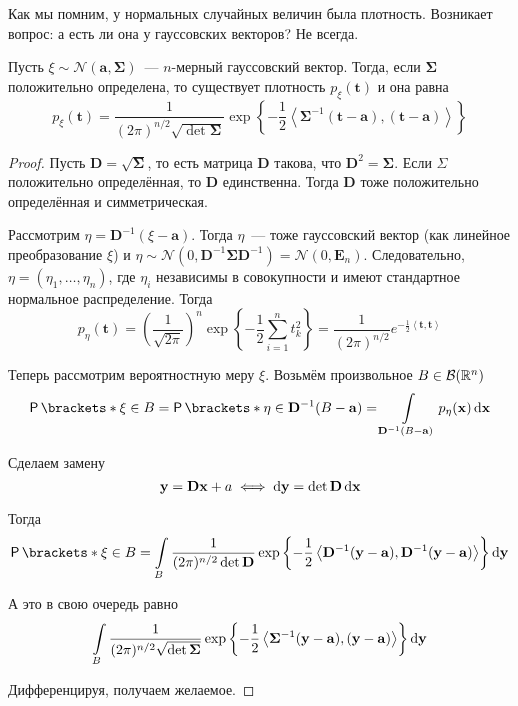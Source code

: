 Как мы помним, у нормальных случайных величин была плотность. Возникает вопрос: а есть ли она у гауссовских векторов? Не всегда.
\begin{theorem}
	Пусть \(\xi \sim \mathcal{N}(\mathbf{a}, \mathbf{\Sigma})\)~--- \(n\)-мерный гауссовский вектор. Тогда, если \(\mathbf{\Sigma}\) положительно определена, то существует плотность \(p_{\xi}(\mathbf{t})\) и она равна
	\[
		p_{\xi}(\mathbf{t}) = 
		\frac{1}{(2\pi)^{n/2}\sqrt{\det{\mathbf{\Sigma}}}} 
		\exp\left\{-\frac{1}{2}\left\langle\mathbf{\Sigma}^{-1}(\mathbf{t}
		 - \mathbf{a}), (\mathbf{t} - \mathbf{a})\right\rangle\right\}
	\]
\end{theorem}
\begin{proof}
	Пусть \(\mathbf{D} = \sqrt{\mathbf{\Sigma}}\), то есть матрица \(\mathbf{D}\) такова, что \(\mathbf{D}^2 = \mathbf{\Sigma}\). Если \(\Sigma\) положительно определённая, то \(\mathbf{D}\) единственна. Тогда \(\mathbf{D}\) тоже положительно определённая и симметрическая.
	
	Рассмотрим \(\eta = \mathbf{D}^{-1}(\xi - \mathbf{a})\). Тогда \(\eta\)~--- тоже гауссовский вектор (как линейное преобразование \(\xi\)) и \(\eta \sim \mathcal{N}(0, \mathbf{D}^{-1}\mathbf{\Sigma}\mathbf{D}^{-1}) = \mathcal{N}(0, \mathbf{E}_n)\). Следовательно, \(\eta = (\eta_1, \dots, \eta_n)\), где \(\eta_i\) независимы в совокупности и имеют стандартное нормальное распределение. Тогда
	\[
		p_{\eta}(\mathbf{t}) = \left(\frac{1}{\sqrt{2\pi}}\right)^{n}\exp\left\{-\frac{1}{2}\sum_{i = 1}^{n}t_k^2\right\} = \frac{1}{(2\pi)^{n/2}}e^{-\frac{1}{2}\left\langle\mathbf{t}, \mathbf{t}\right\rangle}
	\]
	
	Теперь рассмотрим вероятностную меру \(\xi\). Возьмём произвольное \(B \in \mathcal{B}(\mathbb{R}^n)\)
	\begin{align*}
		\Pr{\xi \in B} = \Pr{\eta \in \mathbf{D}^{-1}(B - \mathbf{a})} = \int\limits_{\mathbf{D}^{-1}(B - \mathbf{a})} p_{\eta}(\mathbf{x})\diff \mathbf{x}
	\end{align*}
	
	Сделаем замену
	\[
		\mathbf{y} = \mathbf{Dx} + a \iff \mathop{}\!\mathrm{d} \mathbf{y} = \det{\mathbf{D}}\mathop{}\!\mathrm{d}\mathbf{x}
	\]
	
	Тогда
	\[
		\Pr{\xi \in B} = \int\limits_{B} \frac{1}{(2\pi)^{n/2}\det{\mathbf{D}}} 
		\exp\left\{-\frac{1}{2}\left\langle\mathbf{D}^{-1}(\mathbf{y} - 
		\mathbf{a}), \mathbf{D}^{-1}(\mathbf{y} - 
		\mathbf{a})\right\rangle\right\}\diff\mathbf{y}
	\]
	
	А это в свою очередь равно
	\[
		\int\limits_{B} \frac{1}{(2\pi)^{n/2}\sqrt{\det{\mathbf{\Sigma}}}}
		\exp\left\{-\frac{1}{2}\left\langle\mathbf{\Sigma}^{-1}(\mathbf{y} - 
		\mathbf{a}), (\mathbf{y} - \mathbf{a})\right\rangle 
		\right\}\mathop{}\!\mathrm{d}\mathbf{y}
	\]
	
	Дифференцируя, получаем желаемое.
\end{proof}

